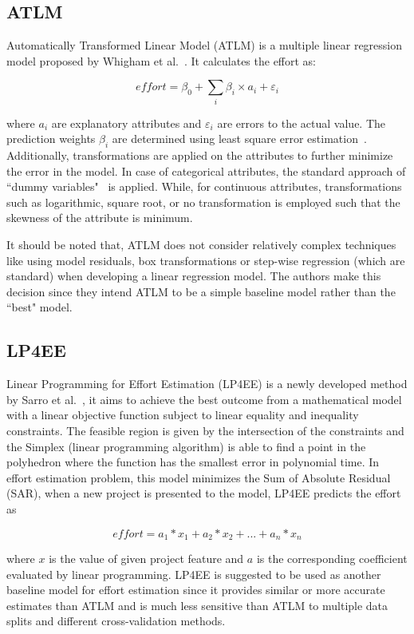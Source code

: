 \documentclass[sigconf,review]{acmart}
\begin{document}
\subsection{ATLM}
\label{sec:atlm}
Automatically Transformed Linear Model (ATLM) is a multiple linear regression model proposed by Whigham et al.~\cite{Whigham:2015}. It calculates the effort as:

\[
\mathit{effort} = \beta_0 + \sum_i\beta_i\times a_{i} +  \varepsilon_i
\]

where $a_i$ are explanatory attributes and $\varepsilon_i$ are errors to the actual value. The prediction weights $\beta_i$ are determined using least square error estimation~\cite{neter1996applied}. Additionally, transformations are applied on the attributes to further minimize the error in the model. In case of categorical attributes, the standard approach of ``dummy variables"~\cite{hardy1993regression} is applied. While, for continuous attributes, transformations such as logarithmic, square root,  or no transformation is employed such that the skewness of the attribute is minimum. 

It should be noted that, ATLM does not consider relatively complex techniques like using model residuals,  box transformations or step-wise regression (which are standard) when developing a linear regression model. The authors make this decision since they intend ATLM to be a simple baseline model rather than the ``best" model.


\subsection{LP4EE}
\label{sec:lp4ee}
Linear Programming for Effort Estimation (LP4EE) is a newly developed method by Sarro et al.~\cite{SarroTOSEM2018}, it aims to achieve the best outcome from a mathematical
model with a linear objective function subject to linear equality and inequality
constraints. The feasible region is given by the intersection of the constraints and the
Simplex (linear programming algorithm) is able to find a point in the polyhedron where
the function has the smallest error in polynomial time. In effort estimation problem, this model minimizes the Sum of Absolute Residual (SAR), when a new project is presented to the model, LP4EE predicts the effort as

\[
\mathit{effort} = a_1*x_1 + a_2*x_2 + ... + a_n*x_n
\]

where $x$ is the value of given project feature and $a$ is the corresponding coefficient evaluated by linear programming.
LP4EE is suggested to be used as another baseline model for effort estimation since it provides
similar or more accurate estimates than ATLM and is much less sensitive than ATLM
to multiple data splits and different cross-validation methods.
\end{document}
